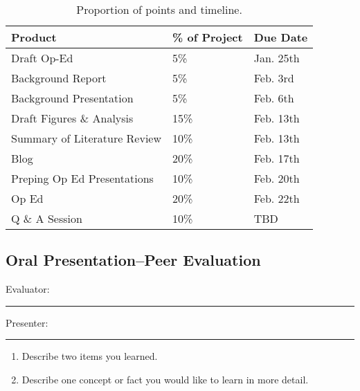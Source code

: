 \documentclass{article}\usepackage[]{graphicx}\usepackage[]{color}
\begin{document}
\begin{table}
\caption{Proportion of points and timeline.}
\begin{tabular}{lll}\hline
Product                     & \% of Project   & Due Date \\\hline\hline
Draft Op-Ed                 & 5\%             & Jan. 25th \\
Background Report           & 5\%             & Feb. 3rd \\
Background Presentation     & 5\%             & Feb. 6th \\
Draft Figures \& Analysis   & 15\%            & Feb. 13th \\
Summary of Literature Review& 10\%            & Feb. 13th \\
Blog                        & 20\%            & Feb. 17th \\
Preping Op Ed Presentations & 10\%            & Feb. 20th \\     
Op Ed                       & 20\%            & Feb. 22th \\
Q \& A Session              & 10\%            & TBD \\ \hline

\end{tabular}
\end{table}

\clearpage
\newpage
\subsection{Oral Presentation--Peer Evaluation}

\bigskip
Evaluator: \rule{7cm}{0.4pt}

\bigskip

\noindent Presenter: \rule{7cm}{0.4pt}

\begin{enumerate}
 \setlength\itemsep{4em}
  \item Describe two items you learned.
  \item Describe one concept or fact you would like to learn in more detail.
\end{enumerate}
\end{document}
